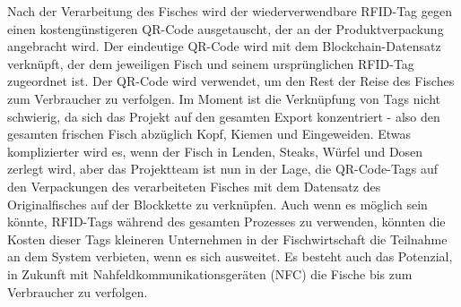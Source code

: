 Nach der Verarbeitung des Fisches wird der wiederverwendbare RFID-Tag gegen einen kostengünstigeren QR-Code ausgetauscht, der an der Produktverpackung angebracht wird. Der eindeutige QR-Code wird mit dem Blockchain-Datensatz verknüpft, der dem jeweiligen Fisch und seinem ursprünglichen RFID-Tag zugeordnet ist. Der QR-Code wird verwendet, um den Rest der Reise des Fisches zum Verbraucher zu verfolgen. Im Moment ist die Verknüpfung von Tags nicht schwierig, da sich das Projekt auf den gesamten Export konzentriert - also den gesamten frischen Fisch abzüglich Kopf, Kiemen und Eingeweiden. Etwas komplizierter wird es, wenn der Fisch in Lenden, Steaks, Würfel und Dosen zerlegt wird, aber das Projektteam ist nun in der Lage, die QR-Code-Tags auf den Verpackungen des verarbeiteten Fisches mit dem Datensatz des Originalfisches auf der Blockkette zu verknüpfen. Auch wenn es möglich sein könnte, RFID-Tags während des gesamten Prozesses zu verwenden, könnten die Kosten dieser Tags kleineren Unternehmen in der Fischwirtschaft die Teilnahme an dem System verbieten, wenn es sich ausweitet. Es besteht auch das Potenzial, in Zukunft mit Nahfeldkommunikationsgeräten (NFC) die Fische bis zum Verbraucher zu verfolgen.

\citep{Visser2017}
\citep{McEntire2019}


